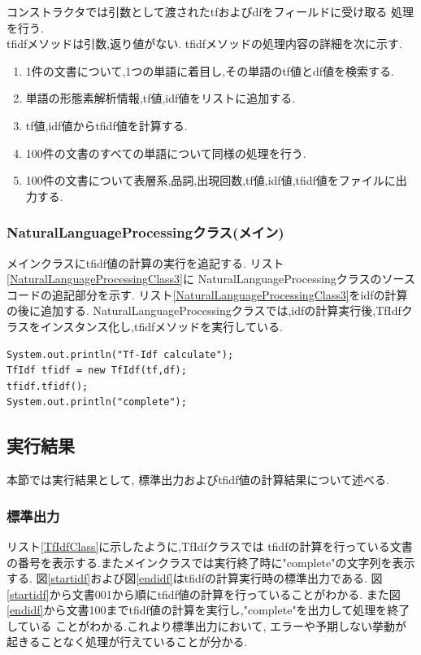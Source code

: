 \documentclass[a4j]{jarticle}
\begin{document}
コンストラクタでは引数として渡されたtfおよびdfをフィールドに受け取る
処理を行う.\\
tfidfメソッドは引数,返り値がない.
tfidfメソッドの処理内容の詳細を次に示す.
\begin{enumerate}
	\item 1件の文書について,1つの単語に着目し,その単語のtf値とdf値を検索する.
	\item 単語の形態素解析情報,tf値,idf値をリストに追加する.
	\item tf値,idf値からtfidf値を計算する.
	\item 100件の文書のすべての単語について同様の処理を行う.
	\item 100件の文書について表層系,品詞,出現回数,tf値,idf値,tfidf値をファイルに出力する.
\end{enumerate}
\subsubsection{NaturalLanguageProcessingクラス(メイン)}
メインクラスにtfidf値の計算の実行を追記する.
リスト\ref{NaturalLanguageProcessingClass3}に
NaturalLanguageProcessingクラスのソースコードの追記部分を示す.
リスト\ref{NaturalLanguageProcessingClass3}をidfの計算の後に追加する.
NaturalLanguageProcessingクラスでは,idfの計算実行後,TfIdfクラスをインスタンス化し,tfidfメソッドを実行している.
\begin{lstlisting}[basicstyle=\ttfamily\footnotesize, frame=single,label=NaturalLanguageProcessingClass3,caption=NaturalLanguageProcessingクラスのソースコード(追記)]
System.out.println("Tf-Idf calculate");
TfIdf tfidf = new TfIdf(tf,df);
tfidf.tfidf();
System.out.println("complete");
\end{lstlisting}
\subsection{実行結果}
本節では実行結果として, 標準出力およびtfidf値の計算結果について述べる.
\subsubsection{標準出力}
リスト\ref{TfIdfClass}に示したように,TfIdfクラスでは
tfidfの計算を行っている文書の番号を表示する.またメインクラスでは実行終了時に"complete"の文字列を表示する.
図\ref{startidf}および図\ref{endidf}はtfidfの計算実行時の標準出力である.
図\ref{startidf}から文書001から順にtfidf値の計算を行っていることがわかる.
また図\ref{endidf}から文書100までtfidf値の計算を実行し,"complete"を出力して処理を終了している
ことがわかる.これより標準出力において, エラーや予期しない挙動が起きることなく処理が行えていることが分かる.
\end{document}
